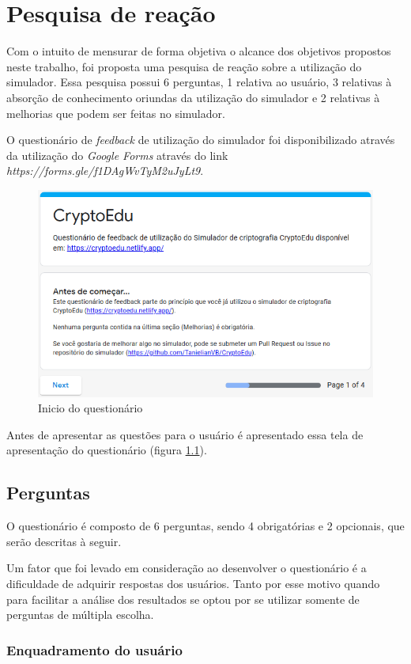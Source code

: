\chapter{Pesquisa de reação}
\label{char:pesquisa}
Com o intuito de mensurar de forma objetiva o alcance dos objetivos propostos neste trabalho, foi proposta uma pesquisa de reação sobre a utilização do simulador. Essa pesquisa possui 6 perguntas, 1 relativa ao usuário, 3 relativas à absorção de conhecimento oriundas da utilização do simulador e 2 relativas à melhorias que podem ser feitas no simulador.

O questionário de \textit{feedback} de utilização do simulador foi disponibilizado através da utilização do \textit{Google Forms} através do link \textit{https://forms.gle/f1DAgWvTyM2uJyLt9}.

\begin{figure}[H]
    \centering
    \caption{Inicio do questionário}
    \label{fig:inicioquestionario}
    \includegraphics[width=0.75\linewidth]{Questionario/QI.png}
\end{figure}

Antes de apresentar as questões para o usuário é apresentado essa tela de apresentação do questionário (figura \ref{fig:inicioquestionario}).

\section{Perguntas}
O questionário é composto de 6 perguntas, sendo 4 obrigatórias e 2 opcionais, que serão descritas à seguir.

Um fator que foi levado em consideração ao desenvolver o  questionário é a dificuldade de adquirir respostas dos usuários. Tanto por esse motivo quando para facilitar a análise dos resultados se optou por se utilizar somente de perguntas de múltipla escolha.

\subsection{Enquadramento do usuário}

